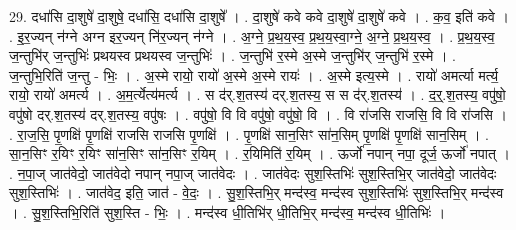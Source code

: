 \documentclass[17pt]{extarticle}
\begin{document}
29. दधा॑सि दा॒शुषे॑ दा॒शुषे॒ दधा॑सि॒ दधा॑सि दा॒शुषे᳚ । . दा॒शुषे॑ कवे कवे दा॒शुषे॑ दा॒शुषे॑ कवे । . क॒व॒ इति॑ कवे । . इ॒र॒ज्यन् न॑ग्ने अग्न इर॒ज्यन् नि॑र॒ज्यन् न॑ग्ने । . अ॒ग्ने॒ प्र॒थ॒य॒स्व॒ प्र॒थ॒य॒स्वा॒ग्ने॒ अ॒ग्ने॒ प्र॒थ॒य॒स्व॒ । . प्र॒थ॒य॒स्व॒ ज॒न्तुभि॑र् ज॒न्तुभिः॑ प्रथयस्व प्रथयस्व ज॒न्तुभिः॑ । . ज॒न्तुभि॑ र॒स्मे अ॒स्मे ज॒न्तुभि॑र् ज॒न्तुभि॑ र॒स्मे । . ज॒न्तुभि॒रिति॑ ज॒न्तु - भिः॒ । . अ॒स्मे रायो॒ रायो॑ अ॒स्मे अ॒स्मे रायः॑ । . अ॒स्मे इत्य॒स्मे । . रायो॑ अमर्त्या मर्त्य॒ रायो॒ रायो॑ अमर्त्य । . अ॒म॒र्त्येत्य॑मर्त्य । . स द॑र्.श॒तस्य॑ दर्.श॒तस्य॒ स स द॑र्.श॒तस्य॑ । . द॒र्॒.श॒तस्य॒ वपु॑षो॒ वपु॑षो दर्.श॒तस्य॑ दर्.श॒तस्य॒ वपु॑षः । . वपु॑षो॒ वि वि वपु॑षो॒ वपु॑षो॒ वि । . वि रा॑जसि राजसि॒ वि वि रा॑जसि । . रा॒ज॒सि॒ पृ॒णक्षि॑ पृ॒णक्षि॑ राजसि राजसि पृ॒णक्षि॑ । . पृ॒णक्षि॑ सान॒सिꣳ सा॑न॒सिम् पृ॒णक्षि॑ पृ॒णक्षि॑ सान॒सिम् । . सा॒न॒सिꣳ र॒यिꣳ र॒यिꣳ सा॑न॒सिꣳ सा॑न॒सिꣳ र॒यिम् । . र॒यिमिति॑ र॒यिम् । . ऊर्जो॑ नपान् नपा॒ दूर्ज॒ ऊर्जो॑ नपात् । . न॒पा॒ज् जात॑वेदो॒ जात॑वेदो नपान् नपा॒ज् जात॑वेदः । . जात॑वेदः सुश॒स्तिभिः॑ सुश॒स्तिभि॒र् जात॑वेदो॒ जात॑वेदः सुश॒स्तिभिः॑ । . जात॑वेद॒ इति॒ जात॑ - वे॒दः॒ । . सु॒श॒स्तिभि॒र् मन्द॑स्व॒ मन्द॑स्व सुश॒स्तिभिः॑ सुश॒स्तिभि॒र् मन्द॑स्व । . सु॒श॒स्तिभि॒रिति॑ सुश॒स्ति - भिः॒ । . मन्द॑स्व धी॒तिभि॑र् धी॒तिभि॒र् मन्द॑स्व॒ मन्द॑स्व धी॒तिभिः॑ । \newline
\end{document}

